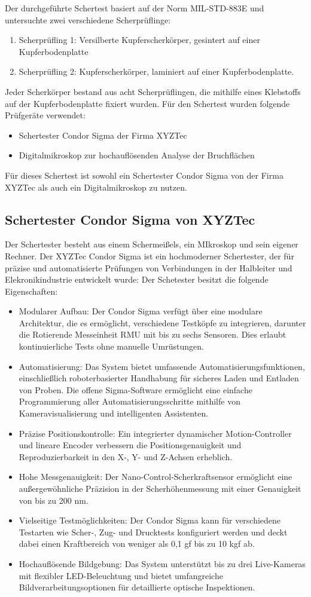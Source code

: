 Der durchgeführte Schertest basiert auf der Norm MIL-STD-883E und untersuchte zwei verschiedene Scherprüflinge:
\begin{enumerate}
    \item Scherprüfling 1: Versilberte Kupferscherkörper, gesintert auf einer Kupferbodenplatte
    \item Scherprüfling 2: Kupferscherkörper, laminiert auf einer Kupferbodenplatte.
\end{enumerate}
Jeder Scherkörper bestand aus acht Scherprüflingen, die mithilfe eines Klebstoffs auf der Kupferbodenplatte fixiert wurden.
Für den Schertest wurden folgende Prüfgeräte verwendet:
\begin{itemize}
    \item Schertester Condor Sigma der Firma XYZTec
    \item Digitalmikroskop zur hochauflösenden Analyse der Bruchflächen
\end{itemize}
Für dieses Schertest ist sowohl ein Schertester Condor Sigma von der Firma XYZTec als auch ein Digitalmikroskop  zu nutzen. 
\subsection{Schertester Condor Sigma von XYZTec}
Der Schertester besteht aus einem Schermeißels, ein MIkroskop und sein eigener Rechner. 
Der XYZTec Condor Sigma ist ein hochmoderner Schertester, der für präzise und automatisierte Prüfungen von Verbindungen in der Halbleiter und Elekronikindustrie entwickelt wurde:
Der Schetester besitzt die folgende Eigenschaften:
\begin{itemize}
    \item Modularer Aufbau: Der Condor Sigma verfügt über eine modulare Architektur, die es ermöglicht, verschiedene Testköpfe zu integrieren, darunter die Rotierende Messeinheit RMU mit bis zu sechs Sensoren. Dies erlaubt kontinuierliche Tests ohne manuelle Umrüstungen. 
    \item Automatisierung: Das System bietet umfassende Automatisierungsfunktionen, einschließlich roboterbasierter Handhabung für sicheres Laden und Entladen von Proben. Die offene Sigma-Software ermöglicht eine einfache Programmierung aller Automatisierungsschritte mithilfe von Kameravisualisierung und intelligenten Assistenten.
    \item Präzise Positionskontrolle: Ein integrierter dynamischer Motion-Controller und lineare Encoder verbessern die Positionsgenauigkeit und Reproduzierbarkeit in den X-, Y- und Z-Achsen erheblich.
    \item Hohe Messgenauigkeit: Der Nano-Control-Scherkraftsensor ermöglicht eine außergewöhnliche Präzision in der Scherhöhenmessung mit einer Genauigkeit von bis zu 200 nm. 
    \item Vielseitige Testmöglichkeiten: Der Condor Sigma kann für verschiedene Testarten wie Scher-, Zug- und Drucktests konfiguriert werden und deckt dabei einen Kraftbereich von weniger als 0,1 gf bis zu 10 kgf ab. 
    \item Hochauflösende Bildgebung: Das System unterstützt bis zu drei Live-Kameras mit flexibler LED-Beleuchtung und bietet umfangreiche Bildverarbeitungsoptionen für detaillierte optische Inspektionen. 
\end{itemize}
